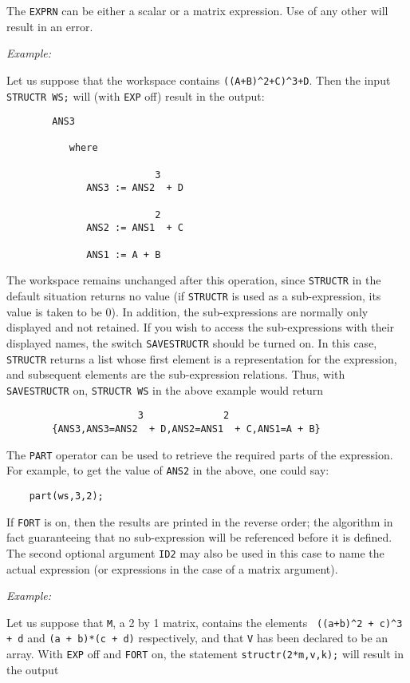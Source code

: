 The {\tt EXPRN} can be either a scalar or a matrix expression.  Use of any
other will result in an error.

{\it Example:}

Let us suppose that the workspace contains
{\tt ((A+B)\verb|^|2+C)\verb|^|3+D}.
Then the input {\tt STRUCTR WS;} will (with {\tt EXP} off) result in the
output:\newpage
\begin{verbatim}
        ANS3

           where

                          3
              ANS3 := ANS2  + D

                          2
              ANS2 := ANS1  + C

              ANS1 := A + B
\end{verbatim}
\hypertarget{switch:SAVESTRUCTR}{}
The workspace remains unchanged after this operation, since {\tt STRUCTR}
 in the default situation returns
no value (if {\tt STRUCTR} is used as a sub-expression, its value is taken
to be 0).  In addition, the sub-expressions are normally only displayed
and not retained. If you wish to access the sub-expressions with their
displayed names, the switch {\tt SAVESTRUCTR} should be
turned on.  In this case, {\tt STRUCTR} returns a list whose first element
is a representation for the expression, and subsequent elements are the
sub-expression relations.  Thus, with {\tt SAVESTRUCTR} on, {\tt STRUCTR WS}
in the above example would return
\vspace{-11pt}
\begin{verbatim}
                       3              2
        {ANS3,ANS3=ANS2  + D,ANS2=ANS1  + C,ANS1=A + B}
\end{verbatim}
The {\tt PART} operator can
be used to retrieve the required parts of the expression.  For example, to
get the value of {\tt ANS2} in the above, one could say:
\begin{verbatim}
	part(ws,3,2);
\end{verbatim}
If {\tt FORT} is on, then the results are printed in the reverse order; the
algorithm in fact guaranteeing that no sub-expression will be referenced
before it is defined.  The second optional argument {\tt ID2} may also be
used in this case to name the actual expression (or expressions in the
case of a matrix argument).

{\it Example:}

Let us suppose that {\tt M}, a 2 by 1 matrix, contains the elements {\tt
((a+b)\verb|^|2 + c)\verb|^|3 + d} and {\tt (a + b)*(c + d)} respectively,
and that {\tt V} has been declared to be an array.  With {\tt EXP} off and
{\tt FORT} on, the statement {\tt structr(2*m,v,k);} will result in the output


